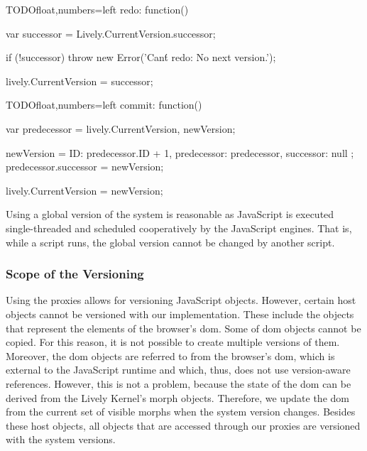 \begin{code}{TODO}{float,numbers=left}
redo: function() {
    var successor = Lively.CurrentVersion.successor;
    
    if (!successor) {
        throw new Error('Can\'t redo: No next version.');
    }
    
    lively.CurrentVersion = successor;
}
\end{code}
\iffalse
\end{verbatim}\fi

\begin{code}{TODO}{float,numbers=left}
commit: function() {
    var predecessor = lively.CurrentVersion,
        newVersion;
    
    newVersion = {
        ID: predecessor.ID + 1,
        predecessor: predecessor,
        successor: null
    };
    predecessor.successor = newVersion;
    
    lively.CurrentVersion = newVersion;
}
\end{code}
\iffalse
\end{verbatim}\fi

Using a global version of the system is reasonable as JavaScript is executed single-threaded and scheduled cooperatively by the JavaScript engines.
That is, while a script runs, the global version cannot be changed by another script.

 
\subsubsection{Scope of the Versioning} \label{subsubsec:IMPLEMENTATION:5.2.1}

Using the proxies allows for versioning JavaScript objects.
However, certain host objects cannot be versioned with our implementation.
These include the objects that represent the elements of the browser's \ac{dom}.
Some of \ac{dom} objects cannot be copied.
For this reason, it is not possible to create multiple versions of them.
Moreover, the \ac{dom} objects are referred to from the browser's \ac{dom}, which is external to the JavaScript runtime and which, thus, does not use version-aware references.
However, this is not a problem, because the state of the \ac{dom} can be derived from the Lively Kernel's morph objects.
Therefore, we update the \ac{dom} from the current set of visible morphs when the system version changes.
Besides these host objects, all objects that are accessed through our proxies are versioned with the system versions.



